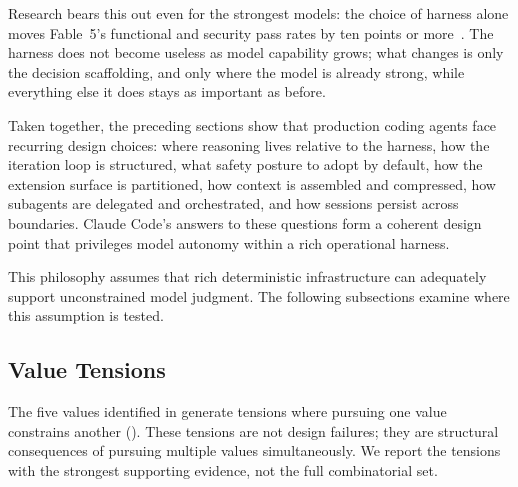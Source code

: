 Research bears this out even for the strongest models: the choice of harness alone moves Fable~5's functional and security pass rates by ten points or more~\citep{endorlabs2026fable}. The harness does not become useless as model capability grows; what changes is only the decision scaffolding, and only where the model is already strong, while everything else it does stays as important as before.


Taken together, the preceding sections show that production coding agents face recurring design choices: where reasoning lives relative to the harness, how the iteration loop is structured, what safety posture to adopt by default, how the extension surface is partitioned, how context is assembled and compressed, how subagents are delegated and orchestrated, and how sessions persist across boundaries. Claude Code's answers to these questions form a coherent design point that privileges model autonomy within a rich operational harness.

This philosophy assumes that rich deterministic infrastructure can adequately support unconstrained model judgment. The following subsections examine where this assumption is tested.

\subsection{Value Tensions}
\label{sec:discuss:tensions}

The five values identified in  generate tensions where pursuing one value constrains another (). These tensions are not design failures; they are structural consequences of pursuing multiple values simultaneously. We report the tensions with the strongest supporting evidence, not the full combinatorial set.

